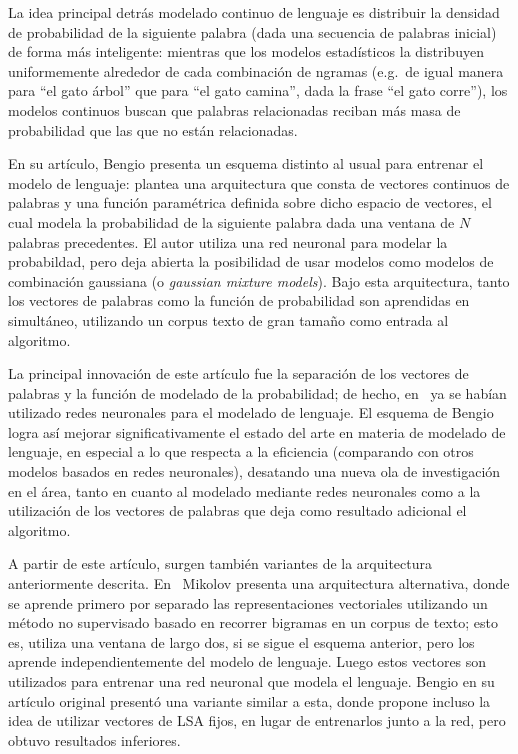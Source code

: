 La idea principal detrás modelado continuo de lenguaje es distribuir la densidad de probabilidad de
la siguiente palabra (dada una secuencia de palabras inicial) de forma más inteligente: mientras que
los modelos estadísticos la distribuyen uniformemente alrededor de cada combinación de ngramas
(e.g.\ de igual manera para ``el gato árbol'' que para ``el gato camina'', dada la frase ``el gato
corre''), los modelos continuos buscan que palabras relacionadas reciban más masa de probabilidad
que las que no están relacionadas.

En su artículo, Bengio presenta un esquema distinto al usual para entrenar el modelo de lenguaje:
plantea una arquitectura que consta de vectores continuos de palabras y una función paramétrica
definida sobre dicho espacio de vectores, el cual modela la probabilidad de la siguiente palabra
dada una ventana de $N$ palabras precedentes. El autor utiliza una red neuronal para modelar la
probabildad, pero deja abierta la posibilidad de usar modelos como modelos de combinación gaussiana
(o \textit{gaussian mixture models}). Bajo esta arquitectura, tanto los vectores de palabras como la
función de probabilidad son aprendidas en simultáneo, utilizando un corpus texto de gran tamaño como
entrada al algoritmo.

La principal innovación de este artículo fue la separación de los vectores de palabras y la función
de modelado de la probabilidad; de hecho, en~\cite{MiikkulainenDyer1991} ya se habían utilizado
redes neuronales para el modelado de lenguaje. El esquema de Bengio logra así mejorar
significativamente el estado del arte en materia de modelado de lenguaje, en especial a lo que
respecta a la eficiencia (comparando con otros modelos basados en redes neuronales), desatando una
nueva ola de investigación en el área, tanto en cuanto al modelado mediante redes neuronales como a
la utilización de los vectores de palabras que deja como resultado adicional el algoritmo.


A partir de este artículo, surgen también variantes de la arquitectura anteriormente
descrita. En~\cite{Mikolov2007, Mikolov2009} Mikolov presenta una arquitectura alternativa, donde se
aprende primero por separado las representaciones vectoriales utilizando un método no supervisado
basado en recorrer bigramas en un corpus de texto; esto es, utiliza una ventana de largo dos, si se
sigue el esquema anterior, pero los aprende independientemente del modelo de lenguaje. Luego estos
vectores son utilizados para entrenar una red neuronal que modela el lenguaje. Bengio en su artículo
original presentó una variante similar a esta, donde propone incluso la idea de utilizar vectores de
LSA fijos, en lugar de entrenarlos junto a la red, pero obtuvo resultados inferiores.

